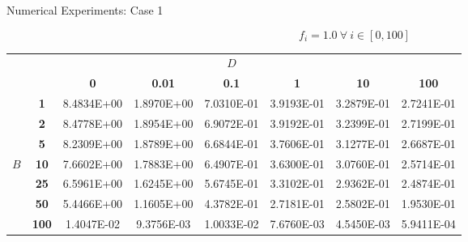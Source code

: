 \documentclass{beamer}
\begin{document}
\begin{frame}{Numerical Experiments: Case 1}

  \[
  f_i = 1.0\ \forall\ i \in [0,100]
  \]

  {\tiny
    \begin{table}[htpb!]
      \begin{center}
        \begin{tabular}{cccccccc}\hline\hline
          \multicolumn{1}{c}{} & \multicolumn{1}{c}{}&
          \multicolumn{1}{c}{}& \multicolumn{1}{c}{}&
          \multicolumn{1}{c}{$D$} & \multicolumn{1}{c}{}&
          \multicolumn{1}{c}{}& \multicolumn{1}{c}{} \\
          & & \textbf{0} & \textbf{0.01} & \textbf{0.1} & \textbf{1} & \textbf{10} & \textbf{100} \\
          & \textbf{1} & 8.4834E+00 & 1.8970E+00 & 7.0310E-01 & 3.9193E-01 & 3.2879E-01 &
          2.7241E-01 \\
          & \textbf{2} & 8.4778E+00 & 1.8954E+00 & 6.9072E-01 & 3.9192E-01 & 3.2399E-01 &
          2.7199E-01 \\
          & \textbf{5} & 8.2309E+00 & 1.8789E+00 & 6.6844E-01 & 3.7606E-01 & 3.1277E-01 &
          2.6687E-01 \\
          $B$ & \textbf{10} & 7.6602E+00 & 1.7883E+00 & 6.4907E-01 & 3.6300E-01 & 3.0760E-01 &
          2.5714E-01 \\
          & \textbf{25} & 6.5961E+00 & 1.6245E+00 & 5.6745E-01 & 3.3102E-01 & 2.9362E-01 &
          2.4874E-01 \\
          & \textbf{50} & 5.4466E+00 & 1.1605E+00 & 4.3782E-01 & 2.7181E-01 & 2.5802E-01 &
          1.9530E-01 \\
          & \textbf{100} & 1.4047E-02 & 9.3756E-03 & 1.0033E-02 & 7.6760E-03 & 4.5450E-03 &
          5.9411E-04 \\
          \hline\hline
        \end{tabular}
      \end{center}
    \end{table}
  }

\end{frame}
\end{document}
